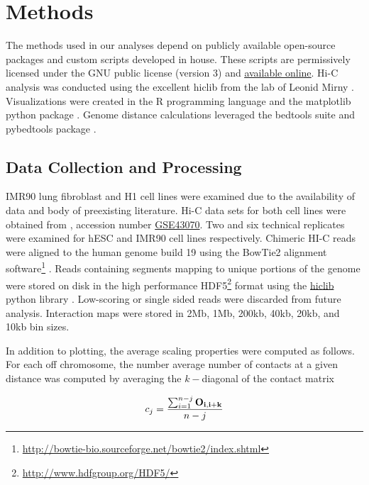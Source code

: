 \chapter{Methods}

The methods used in our analyses depend on publicly available open-source packages and custom scripts developed in house.
These scripts are permissively licensed under the GNU public license (version 3) and
\href{https://github.com/New-College-of-Florida/Jonathan-Niles-Thesis}{\underline{available online}}.  Hi-C analysis was conducted using
the excellent hiclib from the lab of Leonid Mirny \citep{imakaev2012}.  Visualizations were created in the R programming
language \citep{r2009} and the matplotlib python package \citep{hunter2007}.  Genome distance calculations leveraged the
bedtools suite \citep{quinlan2010} and pybedtools package \citep{dale2011}.

\section*{Data Collection and Processing}

IMR90 lung fibroblast and H1  cell lines were examined due to the availability of data and body of preexisting
literature.  Hi-C data sets for both cell lines were obtained from  \citep{edgar2002}, accession number
\href{http://www.ncbi.nlm.nih.gov/geo/query/acc.cgi?acc=GSE43070}{GSE43070}.  Two and six technical replicates were examined for
\gls{hESC} and IMR90 cell lines respectively.  Chimeric HI-C reads were aligned to the human genome build 19 using the BowTie2
alignment software\footnote{\url{http://bowtie-bio.sourceforge.net/bowtie2/index.shtml}} \citep{langmead2012}. Reads containing
segments mapping to unique portions of the genome were stored on disk in the high performance
HDF5\footnote{\url{http://www.hdfgroup.org/HDF5/}} format using the \href{https://bitbucket.org/mirnylab/hiclib}{hiclib} python
library \citep{imakaev2012}.  Low-scoring or single sided reads were discarded from future analysis.  Interaction maps were
stored in 2Mb, 1Mb, 200kb, 40kb, 20kb, and 10kb bin sizes.

In addition to plotting, the average scaling properties were computed as follows.  For each off chromosome, the number average
number of contacts at a given distance was computed by averaging the $k-$diagonal of the contact matrix

\begin{align}
  c_j = \frac{\sum_{i=1}^{n - j} \mathbf{O_{i, i+k}}}{n - j} \label{eq:probeScale}
\end{align}


